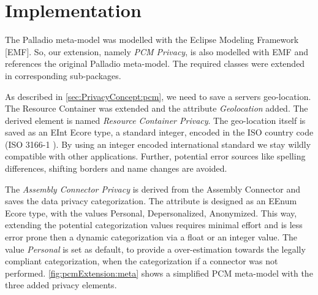 \section{Implementation}
\label{sec:pcmExtension:impl}

The Palladio meta-model was modelled with the Eclipse Modeling Framework [EMF]. So, our extension, namely \textit{PCM Privacy}, is also modelled with EMF and references the original Palladio meta-model. The required classes were extended in corresponding sub-packages.

As described in \autoref{sec:PrivacyConcept:pcm}, we need to save a servers geo-location. The Resource Container was extended and the attribute \textit{Geolocation} added. The derived element is named \textit{Resource Container Privacy}. The geo-location itself is saved as an EInt Ecore type, a standard integer, encoded in the ISO country code (ISO 3166-1 \cite{Wikipedia.ISO_3166}). By using an integer encoded international standard we stay wildly compatible with other applications. Further, potential error sources like spelling differences, shifting borders and name changes are avoided.

The \textit{Assembly Connector Privacy} is derived from the Assembly Connector and saves the data privacy categorization. The attribute is designed as an EEnum Ecore type, with the values Personal, Depersonalized, Anonymized. This way, extending the potential categorization values requires minimal effort and is less error prone then a dynamic categorization via a float or an integer value. The value \textit{Personal} is set as default, to provide a over-estimation towards the legally compliant categorization, when the categorization if a connector was not performed. \autoref{fig:pcmExtension:meta} shows a simplified PCM meta-model with the three added privacy elements.





